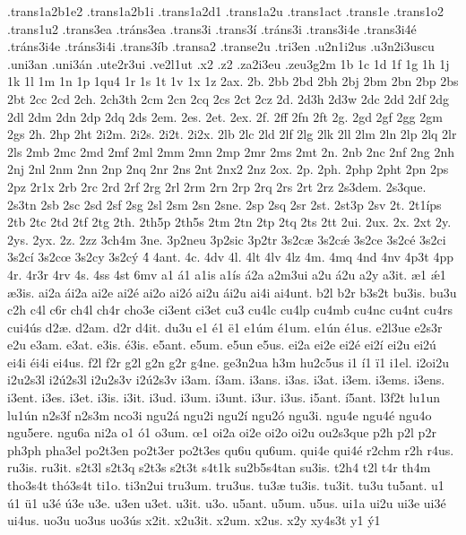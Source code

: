 {.trans1a2b1e2
.trans1a2b1i
.trans1a2d1
.trans1a2u
.trans1act
.trans1e
.trans1o2
.trans1u2
.trans3ea
.tráns3ea
.trans3i
.trans3í
.tráns3i
.trans3i4e
.trans3i4é
.tráns3i4e
.tráns3i4i
.trans3íb
.transa2
.transe2u
.tri3en
.u2n1i2us
.u3n2i3uscu
.uni3an
.uni3án
.ute2r3ui
.ve2l1ut
.x2
.z2
.za2i3eu
.zeu3g2m
1b
1c
1d
1f
1g
1h
1j
1k
1l
1m
1n
1p
1qu4
1r
1s
1t
1v
1x
1z
2ax.
2b.
2bb
2bd
2bh
2bj
2bm
2bn
2bp
2bs
2bt
2cc
2cd
2ch.
2ch3th
2cm
2cn
2cq
2cs
2ct
2cz
2d.
2d3h
2d3w
2dc
2dd
2df
2dg
2dl
2dm
2dn
2dp
2dq
2ds
2em.
2es.
2et.
2ex.
2f.
2ff
2fn
2ft
2g.
2gd
2gf
2gg
2gm
2gs
2h.
2hp
2ht
2i2m.
2i2s.
2i2t.
2i2x.
2lb
2lc
2ld
2lf
2lg
2lk
2ll
2lm
2ln
2lp
2lq
2lr
2ls
2mb
2mc
2md
2mf
2ml
2mm
2mn
2mp
2mr
2ms
2mt
2n.
2nb
2nc
2nf
2ng
2nh
2nj
2nl
2nm
2nn
2np
2nq
2nr
2ns
2nt
2nx2
2nz
2ox.
2p.
2ph.
2php
2pht
2pn
2ps
2pz
2r1x
2rb
2rc
2rd
2rf
2rg
2rl
2rm
2rn
2rp
2rq
2rs
2rt
2rz
2s3dem.
2s3que.
2s3tn
2sb
2sc
2sd
2sf
2sg
2sl
2sm
2sn
2sne.
2sp
2sq
2sr
2st.
2st3p
2sv
2t.
2t1íps
2tb
2tc
2td
2tf
2tg
2th.
2th5p
2th5s
2tm
2tn
2tp
2tq
2ts
2tt
2ui.
2ux.
2x.
2xt
2y.
2ys.
2yx.
2z.
2zz
3ch4m
3ne.
3p2neu
3p2sic
3p2tr
3s2cæ
3s2cǽ
3s2ce
3s2cé
3s2ci
3s2cí
3s2cœ
3s2cy
3s2cý
4́
4ant.
4c.
4dv
4l.
4lt
4lv
4lz
4m.
4mq
4nd
4nv
4p3t
4pp
4r.
4r3r
4rv
4s.
4ss
4st
6mv
a1
á1
a1is
a1ís
á2a
a2m3ui
a2u
á2u
a2y
a3it.
æ1
ǽ1
æ3is.
ai2a
ái2a
ai2e
ai2é
ai2o
ai2ó
ai2u
ái2u
ai4i
ai4unt.
b2l
b2r
b3s2t
bu3is.
bu3u
c2h
c4l
c6r
ch4l
ch4r
cho3e
ci3ent
ci3et
cu3
cu4lc
cu4lp
cu4mb
cu4nc
cu4nt
cu4rs
cui4ús
d2æ.
d2am.
d2r
d4it.
du3u
e1
é1
ë1
e1úm
é1um.
e1ún
é1us.
e2l3ue
e2s3r
e2u
e3am.
e3at.
e3is.
é3is.
e5ant.
e5um.
e5un
e5us.
ei2a
ei2e
ei2é
ei2í
ei2u
ei2ú
ei4i
éi4i
ei4us.
f2l
f2r
g2l
g2n
g2r
g4ne.
ge3n2ua
h3m
hu2c5us
i1
í1
ï1
i1el.
i2oi2u
i2u2s3l
i2ú2s3l
i2u2s3v
i2ú2s3v
i3am.
í3am.
i3ans.
i3as.
i3at.
i3em.
i3ems.
i3ens.
i3ent.
i3es.
i3et.
i3is.
i3it.
i3ud.
i3um.
i3unt.
i3ur.
i3us.
i5ant.
í5ant.
l3f2t
lu1un
lu1ún
n2s3f
n2s3m
nco3i
ngu2á
ngu2i
ngu2í
ngu2ó
ngu3i.
ngu4e
ngu4é
ngu4o
ngu5ere.
ngu6a
ni2a
o1
ó1
o3um.
œ1
oi2a
oi2e
oi2o
oi2u
ou2s3que
p2h
p2l
p2r
ph3ph
pha3el
po2t3en
po2t3er
po2t3es
qu6u
qu6um.
qui4e
qui4é
r2chm
r2h
r4us.
ru3is.
ru3it.
s2t3l
s2t3q
s2t3s
s2t3t
s4t1k
su2b5s4tan
su3is.
t2h4
t2l
t4r
th4m
tho3s4t
thó3s4t
ti1o.
ti3n2ui
tru3um.
tru3us.
tu3æ
tu3is.
tu3it.
tu3u
tu5ant.
u1
ú1
ü1
u3é
ú3e
u3e.
u3en
u3et.
u3it.
u3o.
u5ant.
u5um.
u5us.
ui1a
ui2u
ui3e
ui3é
ui4us.
uo3u
uo3us
uo3ús
x2it.
x2u3it.
x2um.
x2us.
x2y
xy4s3t
y1
ý1
}
